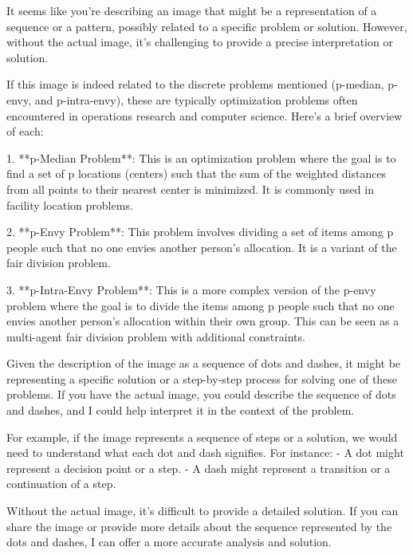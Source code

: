It seems like you're describing an image that might be a representation of a sequence or a pattern, possibly related to a specific problem or solution. However, without the actual image, it's challenging to provide a precise interpretation or solution.

If this image is indeed related to the discrete problems mentioned (p-median, p-envy, and p-intra-envy), these are typically optimization problems often encountered in operations research and computer science. Here’s a brief overview of each:

1. **p-Median Problem**: This is an optimization problem where the goal is to find a set of p locations (centers) such that the sum of the weighted distances from all points to their nearest center is minimized. It is commonly used in facility location problems.

2. **p-Envy Problem**: This problem involves dividing a set of items among p people such that no one envies another person's allocation. It is a variant of the fair division problem.

3. **p-Intra-Envy Problem**: This is a more complex version of the p-envy problem where the goal is to divide the items among p people such that no one envies another person's allocation within their own group. This can be seen as a multi-agent fair division problem with additional constraints.

Given the description of the image as a sequence of dots and dashes, it might be representing a specific solution or a step-by-step process for solving one of these problems. If you have the actual image, you could describe the sequence of dots and dashes, and I could help interpret it in the context of the problem.

For example, if the image represents a sequence of steps or a solution, we would need to understand what each dot and dash signifies. For instance:
- A dot might represent a decision point or a step.
- A dash might represent a transition or a continuation of a step.

Without the actual image, it's difficult to provide a detailed solution. If you can share the image or provide more details about the sequence represented by the dots and dashes, I can offer a more accurate analysis and solution.